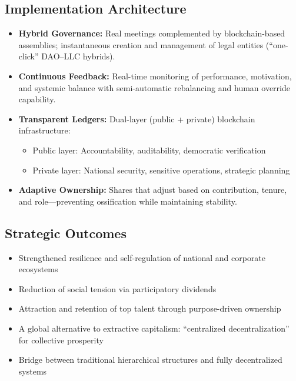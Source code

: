 \documentclass[11pt,a4paper]{article}
\theoremstyle{definition}
\theoremstyle{remark}
\begin{document}
\subsection{Implementation Architecture}

\begin{itemize}[leftmargin=1.5em]
    \item \textbf{Hybrid Governance:} Real meetings complemented by blockchain-based assemblies; instantaneous creation and management of legal entities (``one-click'' DAO--LLC hybrids).
    
    \item \textbf{Continuous Feedback:} Real-time monitoring of performance, motivation, and systemic balance with semi-automatic rebalancing and human override capability.
    
    \item \textbf{Transparent Ledgers:} Dual-layer (public + private) blockchain infrastructure:
    \begin{itemize}
        \item Public layer: Accountability, auditability, democratic verification
        \item Private layer: National security, sensitive operations, strategic planning
    \end{itemize}
    
    \item \textbf{Adaptive Ownership:} Shares that adjust based on contribution, tenure, and role---preventing ossification while maintaining stability.
\end{itemize}

\subsection{Strategic Outcomes}

\begin{itemize}[leftmargin=1.5em]
    \item Strengthened resilience and self-regulation of national and corporate ecosystems
    \item Reduction of social tension via participatory dividends
    \item Attraction and retention of top talent through purpose-driven ownership
    \item A global alternative to extractive capitalism: ``centralized decentralization'' for collective prosperity
    \item Bridge between traditional hierarchical structures and fully decentralized systems
\end{itemize}
\end{document}
